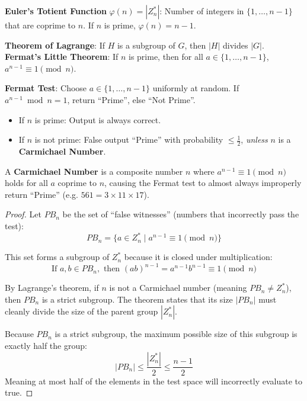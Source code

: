 \begin{definition}
	\textbf{Euler's Totient Function} $\varphi(n) = |Z_n^*|$: Number of integers in $\{1, \dots, n-1\}$ that are coprime to $n$.
	If $n$ is prime, $\varphi(n) = n-1$.
\end{definition}

\begin{theorem}
	\textbf{Theorem of Lagrange}: If $H$ is a subgroup of $G$, then $|H|$ divides $|G|$. \\
	\textbf{Fermat's Little Theorem}: If $n$ is prime, then for all $a \in \{1, \dots, n-1\}$, $a^{n-1} \equiv 1 \pmod n$.
\end{theorem}


\begin{algorithm}
	\textbf{Fermat Test}: Choose $a \in \{1, \dots, n-1\}$ uniformly at random. If $a^{n-1} \bmod n = 1$, return ``Prime'', else ``Not Prime''.
\end{algorithm}

\begin{remark}
	\begin{itemize}
		\item If $n$ is prime: Output is always correct.
		\item If $n$ is not prime: False output ``Prime'' with probability $\leq \frac{1}{2}$, \textit{unless} $n$ is a \textbf{Carmichael Number}.
	\end{itemize}
\end{remark}

\begin{definition}
	A \textbf{Carmichael Number} is a composite number $n$ where $a^{n-1} \equiv 1 \pmod n$ holds for all $a$ coprime to $n$, causing the Fermat test to almost always improperly return ``Prime'' (e.g. $561 = 3 \times 11 \times 17$).
\end{definition}

\begin{proof}
	Let $PB_n$ be the set of ``false witnesses'' (numbers that incorrectly pass the test):
	$$ PB_n = \{a \in Z_n^* \mid a^{n-1} \equiv 1 \pmod n\} $$

	This set forms a subgroup of $Z_n^*$ because it is closed under multiplication:
	$$ \text{If } a, b \in PB_n, \text{ then } (ab)^{n-1} = a^{n-1} b^{n-1} \equiv 1 \pmod n $$

	By Lagrange's theorem, if $n$ is not a Carmichael number (meaning $PB_n \neq Z_n^*$), then $PB_n$ is a strict subgroup. The theorem states that its size $|PB_n|$ must cleanly divide the size of the parent group $|Z_n^*|$.

	Because $PB_n$ is a strict subgroup, the maximum possible size of this subgroup is exactly half the group:
	$$ |PB_n| \leq \frac{|Z_n^*|}{2} \leq \frac{n-1}{2} $$
	Meaning at most half of the elements in the test space will incorrectly evaluate to true.
\end{proof}

